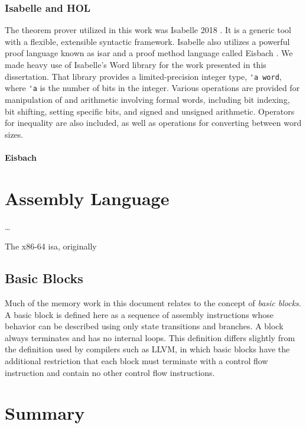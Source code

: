 \subsubsection{Isabelle and HOL}
The theorem prover utilized in this work
was Isabelle 2018 \autocite{nipkow2002isabelle}.%
It is a generic tool with a flexible, extensible syntactic framework.
Isabelle also utilizes a powerful proof language
known as \ac{isar}  \autocite{wenzel2007isabelle}
and a proof method language called Eisbach \autocite{matichuk2016eisbach}.
We made heavy use of Isabelle's Word library  \autocite{isabelle-word-session}
for the work presented in this dissertation.
That library provides a limited-precision integer type, \lstinline|'a word|,
where \lstinline|'a| is the number of bits in the integer.
Various operations are provided for manipulation of and arithmetic involving formal words,
including bit indexing, bit shifting, setting specific bits,
and signed and unsigned arithmetic.
Operators for inequality are also included,
as well as operations for converting between word sizes.

\paragraph{Eisbach}


%
%

\section{Assembly Language}
\todo\dots

The x86-64
\ac{isa}, originally

\subsection{Basic Blocks}
Much of the memory work in this document relates to the concept of \emph{basic blocks}.%
A basic block is defined here as a sequence of assembly instructions
whose behavior can be described using only state transitions and branches.
A block always terminates and has no internal loops.
This definition differs slightly from the definition used by compilers such as LLVM,
in which basic blocks have the additional restriction that
each block must terminate with a control flow instruction and contain no other
control flow instructions.

\section{Summary}
